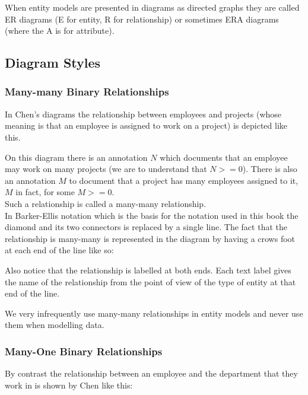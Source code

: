 \mynote When entity models are presented in diagrams as directed graphs
they are called ER diagrams (E for entity, R for relationship) or sometimes
ERA diagrams (where the A is for attribute). 

\subsection{Diagram Styles}

\subsubsection*{Many-many Binary Relationships}
In Chen's diagrams the relationship between employees and projects (whose meaning is that
an employee is assigned to work on a project) is depicted like this.
\begin{center}

\end{center}
On this diagram there is an annotation $N$ which documents that an employee may work on many projects (we are to understand that $N >= 0$). There is also an annotation $M$ to document that
a project has many employees assigned to it, $M$ in fact, for some $M >= 0$. \\

\noindent Such a relationship is called a many-many relationship.  \\

\noindent In Barker-Ellis notation which is the basis for the notation used in this book the diamond and its two connectors is replaced by a single line. The fact that the relationship is many-many is represented in the diagram by having a crows foot at each end of the line like so:


\begin{center}

\end{center}

\noindent Also notice that the relationship is labelled at both ends. Each text label gives the name of the relationship from the point of view of the type of entity at that end of the line.

\noindent We very infrequently use many-many relationships in entity models and never use them when modelling data. 

\subsubsection*{Many-One Binary Relationships}
By contrast the relationship between an employee and the department that they work in is shown by Chen like this:
\begin{center}

\end{center}

